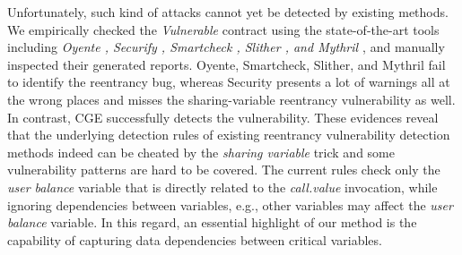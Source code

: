 Unfortunately, such kind of attacks cannot yet be detected by existing methods. We empirically checked the \emph{Vulnerable} contract using the state-of-the-art tools including \emph{Oyente \cite{oyente}, Securify \cite{securify}, {Smartcheck} \cite{smartcheck}, Slither \cite{feist2019slither}, and Mythril \cite{mythril}}, and manually inspected their generated reports. Oyente, Smartcheck, Slither, and Mythril fail to identify the reentrancy bug, whereas Security presents a lot of warnings all at the wrong places and misses the sharing-variable reentrancy vulnerability as well. In contrast, CGE successfully detects the vulnerability. These evidences reveal that the underlying detection rules of existing reentrancy vulnerability detection methods indeed can be cheated by the \emph{sharing variable} trick and some vulnerability patterns are hard to be covered. The current rules check only the \emph{user balance} variable that is directly related to the \emph{call.value} invocation, while ignoring dependencies between variables, e.g., other variables may affect the \emph{user balance} variable. In this regard, an essential highlight of our method is the capability of capturing data dependencies between critical variables.

\vspace{-0.7em}
